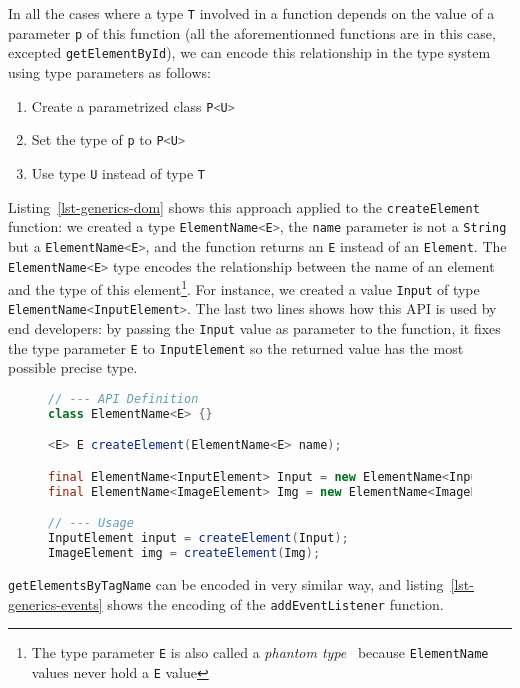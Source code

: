 \documentclass{llncs}
\newcommand{\jscode}[1]{\lstinline[language=JavaScript]|#1|}
\newcommand{\scalacode}[1]{\lstinline[language=Scala]|#1|}
\begin{document}
In all the cases where a type \scalacode{T} involved in a function depends on the value of a parameter \scalacode{p} of this function (all the aforementionned functions are in this case, excepted \jscode{getElementById}), we can encode this relationship in the type system using type parameters as follows:

\begin{enumerate}
 \item Create a parametrized class \scalacode{P<U>}
 \item Set the type of \scalacode{p} to \scalacode{P<U>}
 \item Use type \scalacode{U} instead of type \scalacode{T}
\end{enumerate}

Listing~\ref{lst-generics-dom} shows this approach applied to the \jscode{createElement} function: we created a type \scalacode{ElementName<E>}, the \scalacode{name} parameter is not a \scalacode{String} but a \scalacode{ElementName<E>}, and the function returns an \scalacode{E} instead of an \scalacode{Element}. The \scalacode{ElementName<E>} type encodes the relationship between the name of an element and the type of this element\footnote{The type parameter \scalacode{E} is also called a \emph{phantom type}~\cite{leijen1999domain} because \scalacode{ElementName} values never hold a \scalacode{E} value}. For instance, we created a value \scalacode{Input} of type \scalacode{ElementName<InputElement>}. The last two lines shows how this API is used by end developers: by passing the \scalacode{Input} value as parameter to the function, it fixes the type parameter \scalacode{E} to \scalacode{InputElement} so the returned value has the most possible precise type.

\begin{figure}
\begin{lstlisting}[label=lst-generics-dom,language=java]
// --- API Definition
class ElementName<E> {}

<E> E createElement(ElementName<E> name);

final ElementName<InputElement> Input = new ElementName<InputElement>();
final ElementName<ImageElement> Img = new ElementName<ImageElement>();

// --- Usage
InputElement input = createElement(Input);
ImageElement img = createElement(Img);
\end{lstlisting}
\end{figure}

\scalacode{getElementsByTagName} can be encoded in very similar way, and listing~\ref{lst-generics-events} shows the encoding of the \jscode{addEventListener} function.
\end{document}
